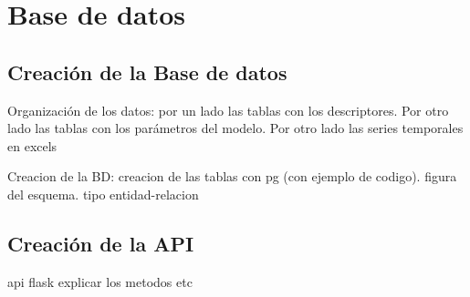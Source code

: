 \chapter{Base de datos}
\label{capitulo 2}

\section{Creación de la Base de datos}
Organización de los datos: por un lado las tablas con los descriptores.
Por otro lado las tablas con los parámetros del modelo.
Por otro lado las series temporales en excels

Creacion de la BD: creacion de las tablas con pg (con ejemplo de codigo). figura del esquema. tipo entidad-relacion

\section{Creación de la API}
api flask
explicar los metodos
etc